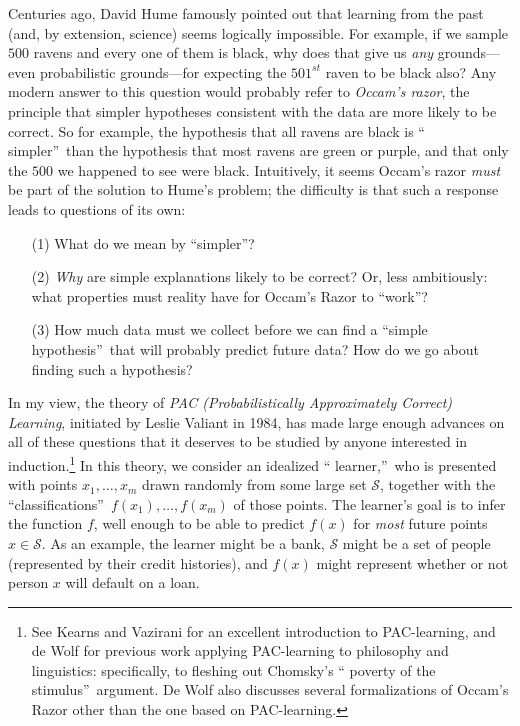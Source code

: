 \documentclass[12pt,onecolumn]{article}%
\begin{document}
Centuries ago, David Hume \cite{hume} famously pointed out that learning from
the past (and, by extension, science) seems logically impossible. For
example, if we sample $500$ ravens and every one of them is black, why does
that give us \textit{any} grounds---even probabilistic grounds---for expecting
the $501^{st}$ raven to be black also? Any modern answer to this question
would probably refer to \textit{Occam's razor}, the principle that simpler
hypotheses consistent with the data are more likely to be correct. So for
example, the hypothesis that all ravens are black is \textquotedblleft
simpler\textquotedblright\  than the hypothesis that most ravens are green or
purple, and that only the $500$ we happened to see were black. Intuitively,
it seems Occam's razor \textit{must} be part of the solution to Hume's
problem; the difficulty is that such a response leads to questions of its own:

\begin{enumerate}
\item[(1)] What do we mean by \textquotedblleft simpler\textquotedblright ?

\item[(2)] \textit{Why} are simple explanations likely to be correct? Or,
less ambitiously: what properties must reality have for Occam's Razor to
\textquotedblleft work\textquotedblright ?

\item[(3)] How much data must we collect before we can find a
\textquotedblleft simple hypothesis\textquotedblright\  that will probably
predict future data? How do we go about finding such a hypothesis?
\end{enumerate}

In my view, the theory of \textit{PAC (Probabilistically Approximately
Correct) Learning}, initiated by Leslie Valiant \cite{valiant:pac} in 1984,
has made large enough advances on all of these questions that it deserves to
be studied by anyone interested in induction.\footnote{See Kearns and Vazirani
\cite{kvaz} for an excellent introduction to PAC-learning, and de Wolf
\cite{dewolf:masters} for previous work applying PAC-learning to philosophy
and linguistics: specifically, to fleshing out Chomsky's \textquotedblleft
poverty of the stimulus\textquotedblright\  argument. De Wolf also discusses
several formalizations of Occam's Razor other than the one based on
PAC-learning.} In this theory, we consider an idealized \textquotedblleft
learner,\textquotedblright\  who is presented with points $x_{1},\ldots,x_{m}%
$ drawn randomly from some large set $\mathcal{S}$, together with the
\textquotedblleft classifications\textquotedblright\  $f(  x_{1})
,\ldots,f(  x_{m})  $ of those points. The learner's goal is to
infer the function $f$, well enough to be able to predict $f(x)
$ for \textit{most} future points $x\in\mathcal{S}$. As an example, the
learner might be a bank, $\mathcal{S}$ might be a set of people (represented
by their credit histories), and $f(x)  $ might represent whether
or not person $x$ will default on a loan.
\end{document}
